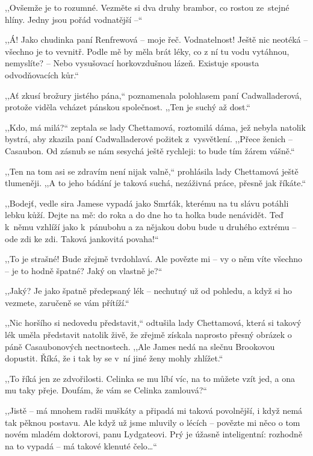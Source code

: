 ,,Ovšemže je to rozumné. Vezměte si dva druhy brambor, co rostou ze stejné hlíny. Jedny jsou pořád vodnatější --``

,,Á! Jako chudinka paní Renfrewová -- moje řeč. Vodnatelnost! Ještě nic neotéká -- všechno je to vevnitř. Podle mě by měla brát léky, co z ní tu vodu vytáhnou, nemyslíte?  -- Nebo vysušovací horkovzdušnou lázeň. Existuje spousta odvodňovacích kůr.``

,,Ať zkusí brožury jistého pána,`` poznamenala polohlasem paní Cadwalladerová, protože viděla vcházet pánskou společnost. ,,Ten je suchý až dost.``

,,Kdo, má milá?`` zeptala se lady Chettamová, roztomilá dáma, jež nebyla natolik bystrá, aby zkazila paní Cadwalladerové požitek z vysvětlení.     
,,Přece ženich -- Casaubon. Od zásnub se nám sesychá ještě rychleji: to bude tím žárem vášně.``

,,Ten na tom asi se zdravím není nijak valně,`` prohlásila lady Chettamová ještě tlumeněji. ,,A to jeho bádání je taková suchá, nezáživná práce, přesně jak říkáte.`` 

,,Bodejť, vedle sira Jamese vypadá jako Smrťák, kterému na tu slávu potáhli lebku kůží. Dejte na mě: do roka a do dne ho ta holka bude nenávidět. Teď k němu vzhlíží jako k pánubohu a za nějakou dobu  bude u druhého extrému -- ode zdi ke zdi. Taková jankovitá povaha!``

,,To je strašné! Bude zřejmě tvrdohlavá. Ale povězte mi -- vy o něm víte všechno -- je to hodně špatné? Jaký on vlastně je?`` 

,,Jaký? Je jako špatně předepsaný lék -- nechutný už od pohledu, a když si ho vezmete, zaručeně se vám přítíží.``

,,Nic horšího si nedovedu představit,`` odtušila lady Chettamová, která si takový lék uměla představit natolik živě, že zřejmě získala naprosto přesný obrázek o páně Casaubonových nectnostech. ,,Ale James nedá na slečnu Brookovou dopustit. Říká, že i tak by se v ní jiné ženy mohly zhlížet.``     

,,To říká jen ze zdvořilosti. Celinka se mu líbí víc, na to můžete vzít jed, a ona mu taky přeje. Doufám, že vám se Celinka zamlouvá?``

,,Jistě -- má mnohem radši muškáty a připadá mi taková povolnější, i když nemá tak pěknou postavu. Ale když už jsme mluvily o lécích -- povězte mi něco o tom novém mladém doktorovi, panu Lydgateovi. Prý je úžasně inteligentní: rozhodně na to vypadá -- má takové  klenuté čelo\ldots``   

